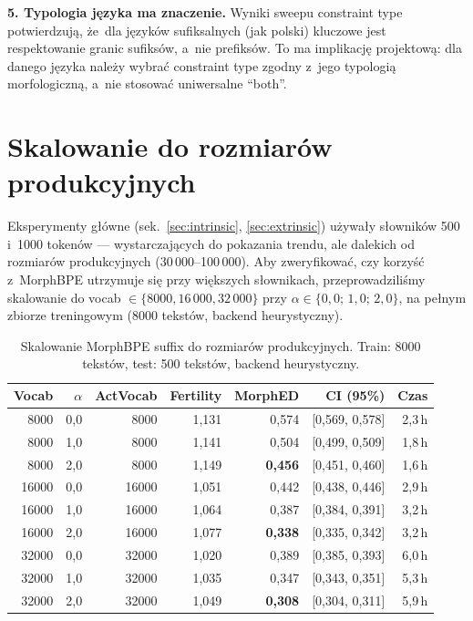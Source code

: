 \textbf{5. Typologia języka ma znaczenie.}
Wyniki sweepu constraint type potwierdzują, że~dla języków
sufiksalnych (jak polski) kluczowe jest respektowanie granic sufiksów,
a~nie prefiksów. To ma implikację projektową: dla danego języka
należy wybrać constraint type zgodny z~jego typologią morfologiczną,
a~nie stosować uniwersalne ``both''.

\section{Skalowanie do rozmiarów produkcyjnych}
\label{sec:scaling}

Eksperymenty główne (sek.~\ref{sec:intrinsic}, \ref{sec:extrinsic})
używały słowników 500 i~1000 tokenów --- wystarczających do pokazania
trendu, ale dalekich od rozmiarów produkcyjnych (30\,000--100\,000).
Aby zweryfikować, czy korzyść z~MorphBPE utrzymuje się przy większych
słownikach, przeprowadziliśmy skalowanie do vocab $\in \{8000, 16\,000, 32\,000\}$
przy $\alpha \in \{0{,}0;\, 1{,}0;\, 2{,}0\}$, na pełnym zbiorze treningowym
(8000 tekstów, backend heurystyczny).

\begin{table}[h]
\centering
\small
\begin{tabular}{rrrrrrr}
\hline
Vocab & $\alpha$ & ActVocab & Fertility & MorphED & CI (95\%) & Czas \\
\hline
8000 & 0{,}0 & 8000 & 1{,}131 & 0{,}574 & [0{,}569, 0{,}578] & 2{,}3\,h \\
8000 & 1{,}0 & 8000 & 1{,}141 & 0{,}504 & [0{,}499, 0{,}509] & 1{,}8\,h \\
8000 & 2{,}0 & 8000 & 1{,}149 & \textbf{0{,}456} & [0{,}451, 0{,}460] & 1{,}6\,h \\
16000 & 0{,}0 & 16000 & 1{,}051 & 0{,}442 & [0{,}438, 0{,}446] & 2{,}9\,h \\
16000 & 1{,}0 & 16000 & 1{,}064 & 0{,}387 & [0{,}384, 0{,}391] & 3{,}2\,h \\
16000 & 2{,}0 & 16000 & 1{,}077 & \textbf{0{,}338} & [0{,}335, 0{,}342] & 3{,}2\,h \\
32000 & 0{,}0 & 32000 & 1{,}020 & 0{,}389 & [0{,}385, 0{,}393] & 6{,}0\,h \\
32000 & 1{,}0 & 32000 & 1{,}035 & 0{,}347 & [0{,}343, 0{,}351] & 5{,}3\,h \\
32000 & 2{,}0 & 32000 & 1{,}049 & \textbf{0{,}308} & [0{,}304, 0{,}311] & 5{,}9\,h \\
\hline
\end{tabular}
\caption{Skalowanie MorphBPE suffix do rozmiarów produkcyjnych.
Train: 8000 tekstów, test: 500 tekstów, backend heurystyczny.}
\label{tab:scaling}
\end{table}


